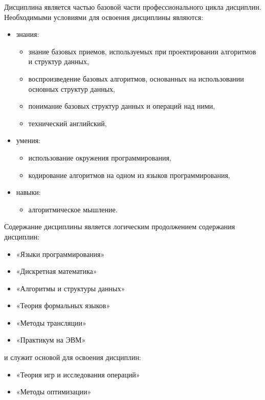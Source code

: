Дисциплина \thecourse{} является частью базовой части профессионального цикла дисциплин.
Необходимыми условиями для освоения дисциплины являются:
\begin{itemize}
\item знания:
\begin{itemize}
\item знание базовых приемов, используемых при проектировании алгоритмов и структур данных,\item воспроизведение базовых алгоритмов, основанных на использовании основных структур данных,\item понимание базовых структур данных и операций над ними,\item технический английский,
\end{itemize}
\item умения:
\begin{itemize}
\item использование окружения программирования,
\item кодирование алгоритмов на одном из языков программирования,
\end{itemize}
\item навыки:
\begin{itemize}
\item алгоритмическое мышление.
\end{itemize}
\end{itemize}


Содержание дисциплины является логическим продолжением содержания дисциплин: 
\begin{itemize}
	\item 
	«Языки программирования»
	\item 
	«Дискретная математика»
	\item 
	«Алгоритмы и структуры данных»
	\item 
	«Теория формальных языков»
	\item 
	«Методы трансляции»
	\item 
	«Практикум на ЭВМ»
\end{itemize} 
и служит основой для освоения дисциплин: 
\begin{itemize}
	\item 
	«Теория игр и исследования операций»
	\item 
	«Методы оптимизации»
\end{itemize}


